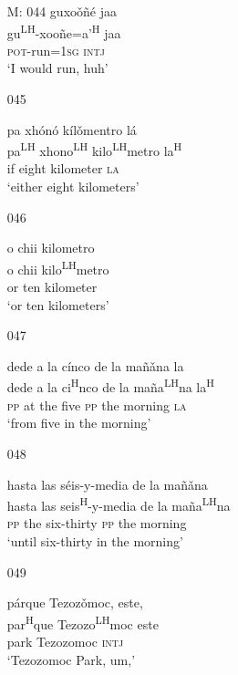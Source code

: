 \begin{itemize}
\item[M: 044]
\glll   guxo\v{o}\~{n}\'{e} jaa\\
gu\textsuperscript{LH}-xoo\~{n}e=a'\textsuperscript{H} jaa\\
\textsc{pot}-run=\textsc{1sg} \textsc{intj}\\
\glt `I would run, huh'
 

\item[045]
 
\glll  pa xh\'{o}n\'{o} k\'{i}l\v{o}mentro l\'{a}\\
pa\textsuperscript{LH} xhono\textsuperscript{LH} kilo\textsuperscript{LH}metro la\textsuperscript{H}\\
if eight kilometer \textsc{la}\\
\glt `either eight kilometers'
 

\item[046]
 
\glll   o chii kilometro\\
o chii kilo\textsuperscript{LH}metro\\
or ten kilometer\\
\glt `or ten kilometers'
 

\item[047]
 
\glll   dede a la c\'{i}nco de la ma\~{n}\v{an}a la\\
dede a la ci\textsuperscript{H}nco de la ma\~{n}a\textsuperscript{LH}na la\textsuperscript{H}\\
\textsc{pp} at the five \textsc{pp} the morning \textsc{la}\\
\glt `from five in the morning'
 

\item[048]
 
\glll  hasta las s\'{e}is-y-media de la ma\~{n}\v{a}na\\
hasta las seis\textsuperscript{H}-y-media de la ma\~{n}a\textsuperscript{LH}na\\
\textsc{pp} the six-thirty \textsc{pp} the morning\\
\glt `until six-thirty in the morning'
 


\item[049]
 
\glll   p\'{a}rque Tezoz\v{o}moc, este,\\
par\textsuperscript{H}que Tezozo\textsuperscript{LH}moc este\\
park Tezozomoc \textsc{intj}\\
\glt `Tezozomoc Park, um,' 
 



\end{itemize}
